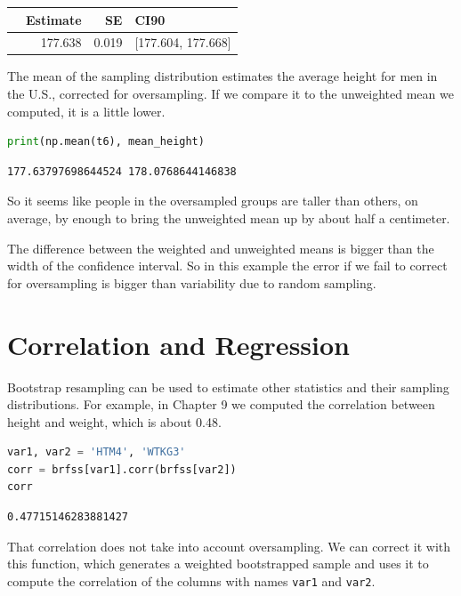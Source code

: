 \begin{tabular}{lrrl}
\toprule
{} &  Estimate &     SE &                CI90 \\
\midrule
{} &   177.638 &  0.019 &  [177.604, 177.668] \\
\bottomrule
\end{tabular}

The mean of the sampling distribution estimates the average height for
men in the U.S., corrected for oversampling. If we compare it to the
unweighted mean we computed, it is a little lower.

\begin{lstlisting}[language=Python,style=source]
print(np.mean(t6), mean_height)
\end{lstlisting}

\begin{lstlisting}[style=output]
177.63797698644524 178.0768644146838
\end{lstlisting}

So it seems like people in the oversampled groups are taller than
others, on average, by enough to bring the unweighted mean up by about
half a centimeter.

The difference between the weighted and unweighted means is bigger than
the width of the confidence interval. So in this example the error if we
fail to correct for oversampling is bigger than variability due to
random sampling.

\hypertarget{correlation-and-regression}{%
\section{Correlation and Regression}\label{correlation-and-regression}}

Bootstrap resampling can be used to estimate other statistics and their
sampling distributions. For example, in Chapter 9 we computed the
correlation between height and weight, which is about 0.48.

\begin{lstlisting}[language=Python,style=source]
var1, var2 = 'HTM4', 'WTKG3'
corr = brfss[var1].corr(brfss[var2])
corr
\end{lstlisting}

\begin{lstlisting}[style=output]
0.47715146283881427
\end{lstlisting}

That correlation does not take into account oversampling. We can correct
it with this function, which generates a weighted bootstrapped sample
and uses it to compute the correlation of the columns with names
\passthrough{\lstinline!var1!} and \passthrough{\lstinline!var2!}.

